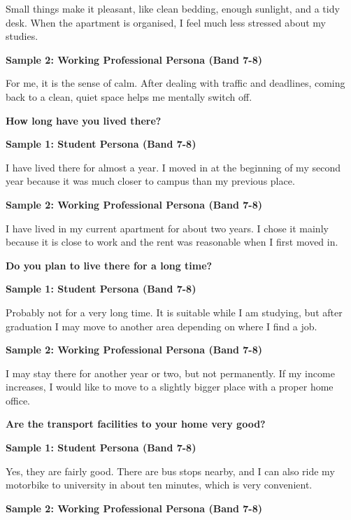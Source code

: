 Small things make it pleasant, like clean bedding, enough sunlight, and a tidy desk. When the apartment is organised, I feel much less stressed about my studies.

\textbf{Sample 2: Working Professional Persona (Band 7-8)}

For me, it is the sense of calm. After dealing with traffic and deadlines, coming back to a clean, quiet space helps me mentally switch off.

\separator

\begin{ieltsquestion}
\textbf{How long have you lived there?}
\end{ieltsquestion}
\textbf{Sample 1: Student Persona (Band 7-8)}

I have lived there for almost a year. I moved in at the beginning of my second year because it was much closer to campus than my previous place.

\textbf{Sample 2: Working Professional Persona (Band 7-8)}

I have lived in my current apartment for about two years. I chose it mainly because it is close to work and the rent was reasonable when I first moved in.

\separator

\begin{ieltsquestion}
\textbf{Do you plan to live there for a long time?}
\end{ieltsquestion}
\textbf{Sample 1: Student Persona (Band 7-8)}

Probably not for a very long time. It is suitable while I am studying, but after graduation I may move to another area depending on where I find a job.

\textbf{Sample 2: Working Professional Persona (Band 7-8)}

I may stay there for another year or two, but not permanently. If my income increases, I would like to move to a slightly bigger place with a proper home office.

\separator

\begin{ieltsquestion}
\textbf{Are the transport facilities to your home very good?}
\end{ieltsquestion}
\textbf{Sample 1: Student Persona (Band 7-8)}

Yes, they are fairly good. There are bus stops nearby, and I can also ride my motorbike to university in about ten minutes, which is very convenient.

\textbf{Sample 2: Working Professional Persona (Band 7-8)}

